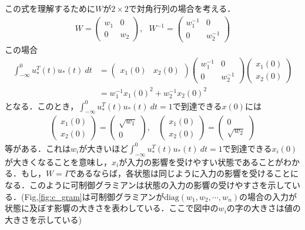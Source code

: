 この式を理解するために$W$が$2 \times 2$で対角行列の場合を考える．
\begin{align}
	W = 
	\left(\begin{array}{cc}
         w_1 & 0 \\
	 0   & w_2 
	\end{array}\right)
	, \ \ \ 
	W^{-1} = 
	\left(\begin{array}{cc}
         w_1^{-1} & 0 \\
	 0   & w_2^{-1} 
	\end{array}\right)
\end{align}
この場合
\begin{align}
	\int_{-\infty}^{0} u_*^T(t) u_*(t) \ dt 
	&=
	\left(\begin{array}{cc}
         x_1(0) & x_2(0) 
	\end{array}\right)
	\left(\begin{array}{cc}
         w_1^{-1} & 0 \\
	 0   & w_2^{-1} 
	\end{array}\right)
	\left(\begin{array}{c}
         x_1(0)\\
	 x_2(0) 
	\end{array}\right)
\\
	&= w_1^{-1} x_1(0)^2 + w_2^{-1} x_2(0)^2
\nonumber
\end{align}
となる．このとき，$\int_{-\infty}^{0} u_*^T(t) u_*(t) \ dt =1$で到達できる$x(0)$には
\begin{align}
	\left(\begin{array}{c}
         x_1(0)\\
	 x_2(0) 
	\end{array}\right)
	= 
	\left(\begin{array}{c}
         \sqrt{w_1}\\
	 0 
	\end{array}\right)
	, \ \ \ \ 
	\left(\begin{array}{c}
         x_1(0)\\
	 x_2(0) 
	\end{array}\right)
	= 
	\left(\begin{array}{c}
         0\\
	 \sqrt{w_2} 
	\end{array}\right)
\end{align}
等がある．これは$w_i$が大きいほど$\int_{-\infty}^{0} u_*^T(t) u_*(t) \ dt =1$で到達できる$x_i(0)$が大きくなることを意味し，$x_i$が入力の影響を受けやすい状態であることがわかる．もし，$W=I$であるならば，各状態は同じように入力の影響を受けることになる．このように可制御グラミアンは状態の入力の影響の受けやすさを示している．(Fig,\ref{fig:c_gram}は可制御グラミアンが$\mbox{diag}(w_1, w_2, \cdots, w_n)$の場合の入力が状態に及ぼす影響の大きさを表わしている．ここで図中の$w_i$の字の大きさは値の大きさを示している)


